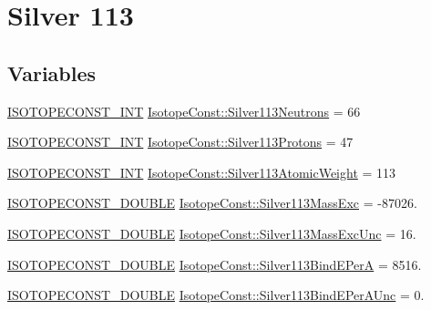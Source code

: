 \hypertarget{group___isotope_const-_silver-_ag113}{}\section{Silver 113}
\label{group___isotope_const-_silver-_ag113}
\subsection*{Variables}
\begin{DoxyCompactItemize}
\item 
\mbox{\hyperlink{group___isotope_const-_macros_ga5f18360b3e99483a35c32d789e62621c}{I\+S\+O\+T\+O\+P\+E\+C\+O\+N\+S\+T\+\_\+\+I\+NT}} \mbox{\hyperlink{group___isotope_const-_silver-_ag113_gac1d6e89946cf383325ae126e5d169039}{Isotope\+Const\+::\+Silver113\+Neutrons}} = 66
\item 
\mbox{\hyperlink{group___isotope_const-_macros_ga5f18360b3e99483a35c32d789e62621c}{I\+S\+O\+T\+O\+P\+E\+C\+O\+N\+S\+T\+\_\+\+I\+NT}} \mbox{\hyperlink{group___isotope_const-_silver-_ag113_ga62ba04b8e6e0e695353381f40dce3953}{Isotope\+Const\+::\+Silver113\+Protons}} = 47
\item 
\mbox{\hyperlink{group___isotope_const-_macros_ga5f18360b3e99483a35c32d789e62621c}{I\+S\+O\+T\+O\+P\+E\+C\+O\+N\+S\+T\+\_\+\+I\+NT}} \mbox{\hyperlink{group___isotope_const-_silver-_ag113_ga2fa15e73b63f581c0028b5c172ef1671}{Isotope\+Const\+::\+Silver113\+Atomic\+Weight}} = 113
\item 
\mbox{\hyperlink{group___isotope_const-_macros_ga8f45a7272ce02c0b4c65c44636ed719a}{I\+S\+O\+T\+O\+P\+E\+C\+O\+N\+S\+T\+\_\+\+D\+O\+U\+B\+LE}} \mbox{\hyperlink{group___isotope_const-_silver-_ag113_gad8c8a6c1bbd32045086c84b0637e3061}{Isotope\+Const\+::\+Silver113\+Mass\+Exc}} = -\/87026.
\item 
\mbox{\hyperlink{group___isotope_const-_macros_ga8f45a7272ce02c0b4c65c44636ed719a}{I\+S\+O\+T\+O\+P\+E\+C\+O\+N\+S\+T\+\_\+\+D\+O\+U\+B\+LE}} \mbox{\hyperlink{group___isotope_const-_silver-_ag113_gaecf7737afc389465849a3dac1cc9a73f}{Isotope\+Const\+::\+Silver113\+Mass\+Exc\+Unc}} = 16.
\item 
\mbox{\hyperlink{group___isotope_const-_macros_ga8f45a7272ce02c0b4c65c44636ed719a}{I\+S\+O\+T\+O\+P\+E\+C\+O\+N\+S\+T\+\_\+\+D\+O\+U\+B\+LE}} \mbox{\hyperlink{group___isotope_const-_silver-_ag113_gab2605b5183efdc43cbca4dd5de3285a9}{Isotope\+Const\+::\+Silver113\+Bind\+E\+PerA}} = 8516.
\item 
\mbox{\hyperlink{group___isotope_const-_macros_ga8f45a7272ce02c0b4c65c44636ed719a}{I\+S\+O\+T\+O\+P\+E\+C\+O\+N\+S\+T\+\_\+\+D\+O\+U\+B\+LE}} \mbox{\hyperlink{group___isotope_const-_silver-_ag113_gab0ebfbc8b9bdc64e23553079b294ce7d}{Isotope\+Const\+::\+Silver113\+Bind\+E\+Per\+A\+Unc}} = 0.

\end{DoxyCompactItemize}
